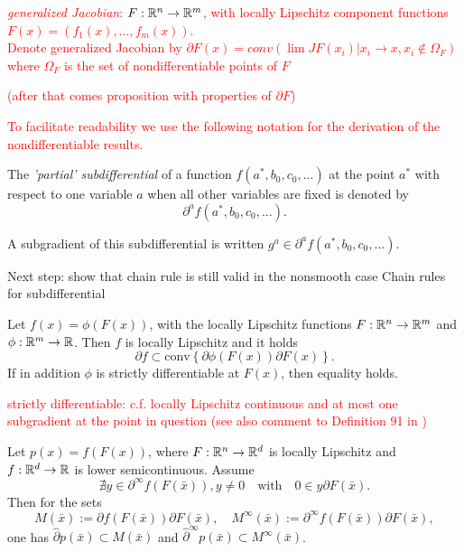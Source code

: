 \textcolor{red}{
\begin{definition}
	\emph{generalized Jacobian}: \(F:\mathbb{R}^n \to \mathbb{R}^m\), with locally Lipschitz component functions \(F(x) = (f_1(x),...,f_m(x))\).\\
	Denote generalized Jacobian by \(\partial F(x) = conv\left(\lim JF(x_i)|x_i\to x, x_i \notin \Omega_F \right) \) where \(\Omega_F\) is the set of nondifferentiable points of \(F\)
\end{definition}
(after that comes proposition with properties of \(\partial F\))}


\textcolor{red}{To facilitate readability we use the following notation for the derivation of the nondifferentiable results.}

The \emph{'partial' subdifferential} of a function \(f(a^*,b_0,c_0,...)\) at the point \(a^*\) with respect to one variable \(a\) when all other variables are fixed is denoted by 
\begin{equation*}
	\partial^{a} f(a^*,b_0,c_0,...).
\end{equation*}

A subgradient of this subdifferential is written \(g^{a} \in \partial^{a} f(a^*,b_0,c_0,...)\).

Next step: show that chain rule is still valid in the nonsmooth case
Chain rules for subdifferential \\

\begin{theorem}
	Let \(f(x)=\phi(F(x))\), with the locally Lipschitz functions \(F: \mathbb{R}^n \to \mathbb{R}^m\) and \(\phi:\mathbb{R}^m \to \mathbb{R}\). Then \(f\) is locally Lipschitz and it holds
	\begin{equation*}
		\partial f \subset \text{conv}\left\{\partial \phi(F(x))\partial F(x)\right\}.
	\end{equation*}
	If in addition \(\phi\) is strictly differentiable at \(F(x)\), then equality holds.
\end{theorem}

\textcolor{red}{strictly differentiable: c.f. \cite[Theorem 9.17 and 9.18]{Rockafellar2009} locally Lipschitz continuous and at most one subgradient at the point in question (see also comment to Definition 91 in \cite{Rockafellar2009})}

\begin{theorem}
	Let \(p(x) = f(F(x))\), where \(F:\mathbb{R}^n \to \mathbb{R}^d\) is locally Lipschitz and \(f:\mathbb{R}^d \to \mathbb{R}\) is lower semicontinuous. 
	Assume \[\nexists y \in \partial^{\infty}f(F(\bar{x})), y \neq 0 \quad \text{with} \quad 0 \in y \partial F(\bar{x}). \]
	Then for the sets 
	\[ M(\bar{x}):= \partial f(F(\bar{x}))\partial F(\bar{x}), \quad M^{\infty}(\bar{x}):= \partial^{\infty}f(F(\bar{x}))\partial F(\bar{x}), \]
	one has \(\hat{\partial}p(\bar{x}) \subset M(\bar{x})\) and \(\hat{\partial}^{\infty} p(\bar{x}) \subset M^{\infty}(\bar{x})\).
\end{theorem}

